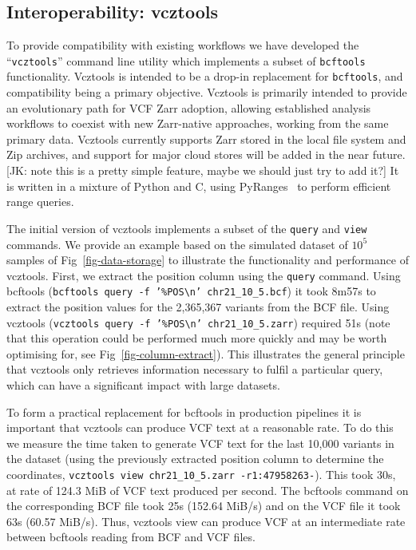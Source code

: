 \documentclass[a4paper,num-refs]{oup-contemporary}
\begin{document}
\subsection{Interoperability: vcztools}
To provide compatibility with existing workflows we have 
developed the ``\texttt{vcztools}'' command line utility which 
implements a subset of \texttt{bcftools} functionality.
Vcztools is intended to be a drop-in replacement for \texttt{bcftools},
and compatibility being a primary objective.
Vcztools is primarily intended to provide an evolutionary path for 
VCF Zarr adoption,
allowing established analysis workflows to coexist with new Zarr-native
approaches, working from the same primary data.
Vcztools currently supports Zarr stored in the local file system
and Zip archives, and support for major cloud stores will be added in the near
future. [JK: note this is a pretty simple feature, maybe we should just try 
to add it?]
It is written in a mixture of Python and C, using
PyRanges~\citep{stovner2020pyranges} to perform efficient range queries.


The initial version of vcztools implements a subset of the \texttt{query}
and \texttt{view} commands. We provide an example based on the simulated 
dataset of $10^5$ samples of Fig~\ref{fig-data-storage} to illustrate 
the functionality and 
performance of vcztools. First, we extract the position column 
using the \texttt{query} command. Using bcftools
(\texttt{bcftools query -f '\%POS\textbackslash n' chr21\_10\_5.bcf})
it took 8m57s to extract the position values for the 2,365,367
variants from the BCF file. 
Using vcztools
(\texttt{vcztools query -f '\%POS\textbackslash n' chr21\_10\_5.zarr})
required 51s (note that this operation could be performed much
more quickly and may be worth optimising for, see 
Fig~\ref{fig-column-extract}). This illustrates the general principle
that vcztools only retrieves information necessary to fulfil a particular 
query, which can have a significant impact with large datasets.

To form a practical replacement for bcftools in production pipelines
it is important that vcztools can produce VCF text at a reasonable
rate. To do this we measure the time taken to generate VCF text for the 
last 10,000 variants in the dataset (using the previously extracted 
position column to determine the coordinates, \texttt{vcztools view
chr21\_10\_5.zarr -r1:47958263-}). This took 30s, at rate of 124.3 MiB
of VCF text produced per second. The bcftools command on the corresponding
BCF file took 25s (152.64 MiB/s) and on the VCF file it took 63s (60.57 MiB/s).
Thus, vcztools view can produce VCF at an intermediate rate between 
bcftools reading from BCF and VCF files.
\end{document}
